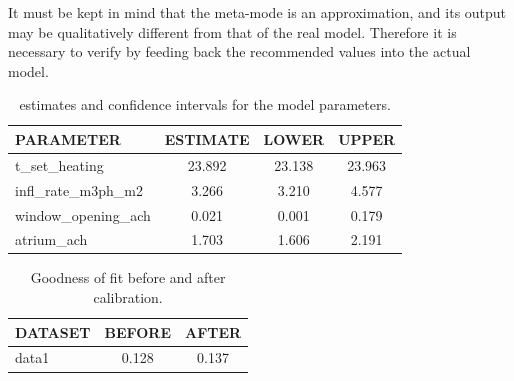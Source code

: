 \documentclass[a4paper]{report}\usepackage[]{graphicx}\usepackage[]{xcolor}
\begin{document}
It must be kept in mind that the meta-mode is an approximation, and its output may be 
	qualitatively different from that of the real model. Therefore it is necessary to verify by feeding back 
	the recommended values into the actual model.
\begin{table}[ht]
\centering
\caption{estimates and confidence intervals for the model parameters.} 
\label{tab:theta}
\begin{tabularx}{\textwidth}{X|ccc}
  \hline
PARAMETER & ESTIMATE & LOWER & UPPER \\ 
  \hline
t\_set\_heating & 23.892 & 23.138 & 23.963 \\ 
  infl\_rate\_m3ph\_m2 & 3.266 & 3.210 & 4.577 \\ 
  window\_opening\_ach & 0.021 & 0.001 & 0.179 \\ 
  atrium\_ach & 1.703 & 1.606 & 2.191 \\ 
   \hline
\end{tabularx}
\end{table}
\begin{table}[ht]
\centering
\caption{Goodness of fit before and after calibration.} 
\label{tab:gof}
\begin{tabularx}{\textwidth}{X|cc}
  \hline
DATASET & BEFORE & AFTER \\ 
  \hline
data1 & 0.128 & 0.137 \\ 
   \hline
\end{tabularx}
\end{table}
\end{document}
